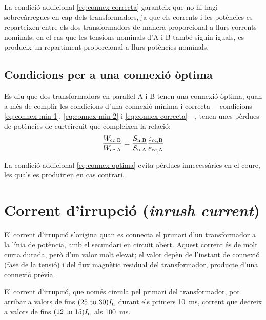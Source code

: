 La condició addicional  \eqref{eq:connex-correcta} garanteix que no hi hagi sobrecàrregues en cap dels transformadors, ja que els corrents i les potències es reparteixen entre els dos transformadors de manera proporcional a llurs corrents nominals; en el cas que les tensions nominals d'A i B també siguin  iguals, es produeix un repartiment proporcional a llurs potències nominals.


\subsection{Condicions per a una connexió òptima}\label{sec:connex-optima}

 Es diu que dos transformadors en paraŀlel A i B tenen una connexió òptima, quan a més de complir les condicions d'una connexió mínima i correcta ---condicions \eqref{eq:connex-min-1}, \eqref{eq:connex-min-2} i \eqref{eq:connex-correcta}---, tenen unes pèrdues de potències de curtcircuit que compleixen la relació:
\begin{equation}
    \frac{W_\mathrm{cc,B}}{W_\mathrm{cc,A}} = \frac{S_\mathrm{n,B}}{S_\mathrm{n,A}} \frac{\varepsilon_\mathrm{cc,B}}{\varepsilon_\mathrm{cc,A}} \label{eq:connex-optima}
\end{equation}

La condició addicional \eqref{eq:connex-optima} evita pèrdues innecessàries en el coure, les quals es produirien en cas contrari.


\section{Corrent d'irrupció (\textit{inrush current})}

El corrent d'irrupció s'origina quan es  connecta el primari d'un transformador a la línia de potència, amb el secundari en circuit obert. Aquest corrent és de molt curta durada, però d'un valor molt elevat; el valor depèn de l'instant de connexió (fase de la tensió) i del flux magnètic residual del transformador, producte d'una connexió prèvia.

El corrent d'irrupció, que només circula pel primari del transformador, pot arribar a valors de fins $(\numrange{25}{30}) I\ped{n}$ durant els primers \qty{10}{ms}, corrent que decreix a valors de fins   $(\numrange{12}{15}) I\ped{n}$ als \qty{100}{ms}.

